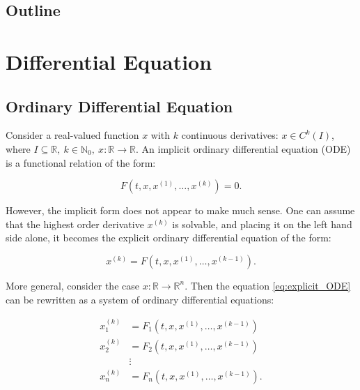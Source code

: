 \documentclass[
	parskip, 			   %
	twoside, 			   %
	DIV=14, 			   %
	BCOR=15.0mm, 		   %
	headsepline, 		   %
	open=right, 		   %
	captions=tableheading, %
	bibliography=totoc,    %
	numbers=noenddot       %
]{scrreprt}
\begin{document}
\section{Outline}


\clearpage
\chapter{Differential Equation}

\section{Ordinary Differential Equation}
Consider a real-valued function $x$ with $k$ continuous derivatives: $x \in C^{k}(I)$, where $ I \subseteq \mathbb{R}, \: k \in \mathbb{N}_{0}, \: x: \mathbb{R} \rightarrow \mathbb{R}$. An implicit ordinary differential equation (ODE) is a functional relation of the form:

\begin{equation}
    \label{eq:implicit_ODE}
    F\left(t, x, x^{(1)}, \ldots, x^{(k)}\right)=0.
\end{equation}

However, the implicit form does not appear to make much sense. One can assume that the highest order derivative $x^{(k)}$ is solvable, and placing it on the left hand side alone, it becomes the explicit ordinary differential equation of the form:

\begin{equation}
    \label{eq:explicit_ODE}
    x^{(k)} = F\left(t, x, x^{(1)}, \ldots, x^{(k-1)}\right).
\end{equation}

More general, consider the case $x: \mathbb{R} \rightarrow \mathbb{R}^{n}$. Then the equation \ref{eq:explicit_ODE} can be rewritten as a system of ordinary differential equations:

\begin{equation}
    \label{eq:ODE_system}
    \begin{aligned}
    x_{1}^{(k)} &=F_{1}\left(t, x, x^{(1)}, \ldots, x^{(k-1)}\right) \\
    x_{2}^{(k)} &=F_{2}\left(t, x, x^{(1)}, \ldots, x^{(k-1)}\right) \\
    & \vdots \\
    x_{n}^{(k)} &=F_{n}\left(t, x, x^{(1)}, \ldots, x^{(k-1)}\right).
\end{aligned}
\end{equation}
\end{document}
